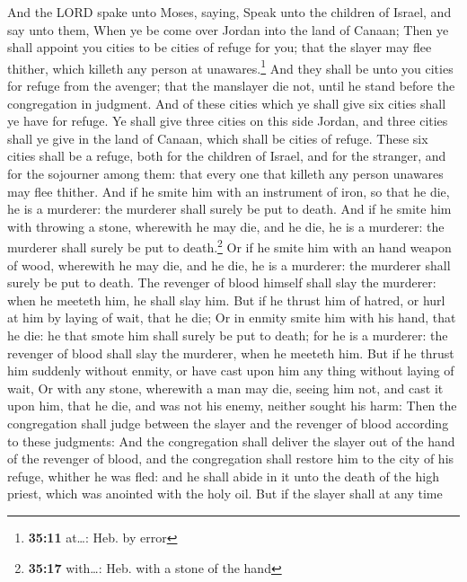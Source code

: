  And the LORD spake unto Moses, saying, 
Speak unto the children of Israel, and say unto them, When ye be come
over Jordan into the land of Canaan;  Then ye shall
appoint you cities to be cities of refuge for you; that the slayer may
flee thither, which killeth any person at unawares.\footnote{\textbf{35:11}
  at\ldots: Heb. by error}  And they shall be unto you
cities for refuge from the avenger; that the manslayer die not, until he
stand before the congregation in judgment.  And of these
cities which ye shall give six cities shall ye have for refuge.
 Ye shall give three cities on this side Jordan, and
three cities shall ye give in the land of Canaan, which shall be cities
of refuge.  These six cities shall be a refuge, both for
the children of Israel, and for the stranger, and for the sojourner
among them: that every one that killeth any person unawares may flee
thither.  And if he smite him with an instrument of iron,
so that he die, he is a murderer: the murderer shall surely be put to
death.  And if he smite him with throwing a stone,
wherewith he may die, and he die, he is a murderer: the murderer shall
surely be put to death.\footnote{\textbf{35:17} with\ldots: Heb. with a
  stone of the hand}  Or if he smite him with an hand
weapon of wood, wherewith he may die, and he die, he is a murderer: the
murderer shall surely be put to death.  The revenger of
blood himself shall slay the murderer: when he meeteth him, he shall
slay him.  But if he thrust him of hatred, or hurl at him
by laying of wait, that he die;  Or in enmity smite him
with his hand, that he die: he that smote him shall surely be put to
death; for he is a murderer: the revenger of blood shall slay the
murderer, when he meeteth him.  But if he thrust him
suddenly without enmity, or have cast upon him any thing without laying
of wait,  Or with any stone, wherewith a man may die,
seeing him not, and cast it upon him, that he die, and was not his
enemy, neither sought his harm:  Then the congregation
shall judge between the slayer and the revenger of blood according to
these judgments:  And the congregation shall deliver the
slayer out of the hand of the revenger of blood, and the congregation
shall restore him to the city of his refuge, whither he was fled: and he
shall abide in it unto the death of the high priest, which was anointed
with the holy oil.  But if the slayer shall at any time
